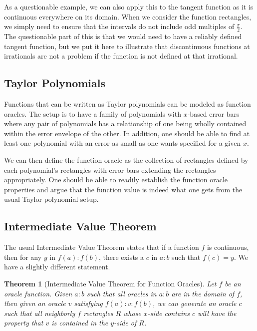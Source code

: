 \documentclass[12pt]{article}
\newtheorem{theorem}{Theorem}
\theoremstyle{remark}
\begin{document}
As a questionable example, we can also apply this to the tangent function as it is continuous everywhere on its domain. When we consider the function rectangles, we simply need to ensure that the intervals do not include odd multiples of $\frac{\pi}{2}$. The questionable part of this is that we would need to have a reliably defined tangent function, but we put it here to illustrate that discontinuous functions at irrationals are not a problem if the function is not defined at that irrational. 


\subsection{Taylor Polynomials}

Functions that can be written as Taylor polynomials can be modeled as function oracles. The setup is to have a family of polynomials with $x$-based error bars where any pair of polynomials has a relationship of one being wholly contained within the error envelope of the other. In addition, one should be able to find at least one polynomial with an error as small as one wants specified for a given $x$. 

We can then define the function oracle as the collection of rectangles defined by each polynomial's rectangles with error bars extending the rectangles appropriately. One should be able to readily establish the function oracle properties and argue that the function value is indeed what one gets from the usual Taylor polynomial setup. 



\subsection{Intermediate Value Theorem}

The usual Intermediate Value Theorem states that if a function $f$ is continuous, then for any $y$ in $f(a):f(b)$, there exists a $c$ in $a:b$ such that $f(c) = y$. We have a slightly different statement.

\begin{theorem}[Intermediate Value Theorem for Function Oracles]
Let $f$ be an oracle function. Given $a:b$ such that all oracles in $a:b$ are in the domain of $f$, then given an oracle $v$ satisfying $f(a):v:f(b)$, we can generate an oracle $c$ such that all neighborly $f$ rectangles $R$ whose $x$-side contains $c$ will have the property that $v$ is contained in the $y$-side of $R$.
\end{theorem}
\end{document}
